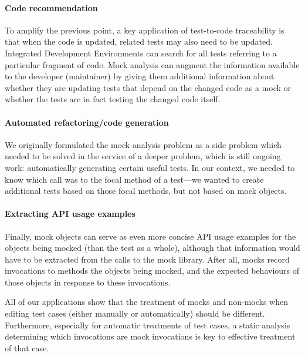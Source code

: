 \paragraph{Code recommendation}
To amplify the previous point, a key application of test-to-code
traceability is that when the code is updated, related tests may also
need to be updated. Integrated Development Environments can search for
all tests referring to a particular fragment of code. Mock analysis
can augment the information available to the developer (maintainer) by
giving them additional information about whether they are updating
tests that depend on the changed code as a mock or whether the tests
are in fact testing the changed code itself.

\paragraph{Automated refactoring/code generation}
We originally formulated the mock analysis problem as a side problem which needed
to be solved in the service of a deeper problem, which is still
ongoing work: automatically generating certain useful tests. In our context,
we needed to know which call was to the focal method of a test---we
wanted to create additional tests based on those focal methods, but
not based on mock objects.

\paragraph{Extracting API usage examples}
Finally, mock objects can serve as even more concise API usage
examples for the objects being mocked (than the test as a whole),
although that information would have to be extracted from the calls to
the mock library. After all, mocks record invocations to methods the objects
being mocked, and the expected behaviours of those objects in response to
these invocations.

All of our applications show that the treatment of mocks and non-mocks
when editing test cases (either manually or automatically) should be different.
Furthermore, especially for automatic treatments of test cases, a static
analysis determining which invocations are mock invocations is key to effective
treatment of that case.

